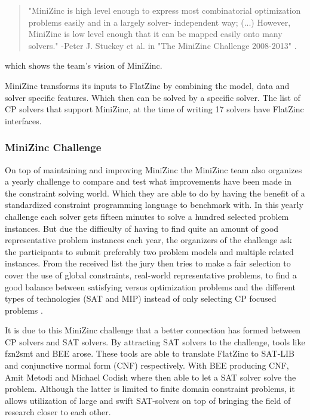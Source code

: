 \begin{quote}
	"MiniZinc is high level enough to express most combinatorial optimization problems easily and in a largely solver-
	independent way; (...) However, MiniZinc is low level enough that it can be mapped easily onto many solvers." 
	\newline
	-Peter J. Stuckey et al. in "The MiniZinc Challenge 2008-2013" \cite{58stuckey2014minizinc}.
\end{quote} which shows the team's vision of MiniZinc.

MiniZinc transforms its inputs to FlatZinc by combining the model, data and solver specific features. Which then can be solved by a specific solver. The list of CP solvers that support MiniZinc, at the time of writing 17 solvers have FlatZinc interfaces.

\subsubsection{MiniZinc Challenge}
On top of maintaining and improving MiniZinc the MiniZinc team also organizes a yearly challenge to compare and test what improvements have been made in the constraint solving world. Which they are able to do by having the benefit of a standardized constraint programming language to benchmark with. 
In this yearly challenge each solver gets fifteen minutes to solve a hundred selected problem instances. But due the difficulty of having to find quite an amount of good representative problem instances each year, the organizers of the challenge ask the participants to submit preferably two problem models and multiple related instances. From the received list the jury then tries to make a fair selection to cover the use of global constraints, real-world representative problems, to find a good balance between satisfying versus optimization problems and the different types of technologies (SAT and MIP) instead of only selecting CP focused problems \cite{58stuckey2014minizinc}.

It is due to this MiniZinc challenge that a better connection has formed between CP solvers and SAT solvers. By attracting SAT solvers to the challenge, tools like fzn2smt \cite{72bofill2010system} and BEE \cite{69BEEmetodi2012compiling} arose. These tools are able to translate FlatZinc to SAT-LIB and conjunctive normal form (CNF) respectively. 
With BEE producing CNF, Amit Metodi and Michael Codish where then able to let a SAT solver solve the problem. Although the latter is limited to finite domain constraint problems, it allows utilization of large and swift SAT-solvers on top of bringing the field of research closer to each other.

